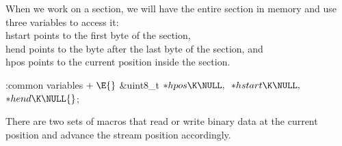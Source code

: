 

When we work on a section, we will have the entire section in
memory and use three variables to access it:  \\{hstart}
points to the first byte of the section, \\{hend} points
to the byte after the last byte of the section, and \\{hpos} points to the
current position inside the section.\label{hpos}

\Y\B\4:common variables\X${}\mathrel+\E{}$\6
\&{uint8\_t} ${}{*}\index{hpos+\\{hpos}}\\{hpos}\K\NULL,{}$ ${}{*}\index{hstart+\\{hstart}}\\{hstart}\K\NULL,{}$ ${}{*}\index{hend+\\{hend}}\\{hend}\K\NULL{}$;
\Y
\fi


There are two sets of macros that read or write binary data at the current position
and advance the stream position accordingly.\label{HPUT}\label{HGET}

